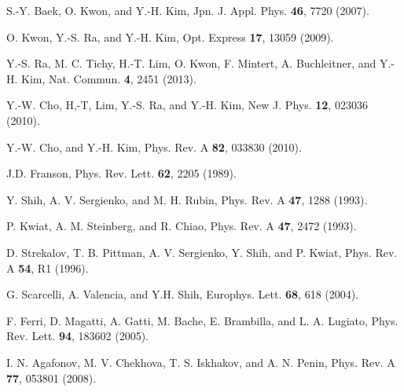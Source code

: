 \documentclass[aps,prl,reprint,showpacs,superscriptaddress]{revtex4-1}
\begin{document}
\begin{thebibliography}{99}
S.-Y. Baek, O. Kwon, and Y.-H. Kim, Jpn. J. Appl. Phys.  \textbf{46}, 7720 (2007).

O. Kwon, Y.-S. Ra, and Y.-H. Kim, Opt. Express \textbf{17}, 13059 (2009).

Y.-S. Ra, M. C. Tichy, H.-T. Lim, O. Kwon, F. Mintert, A. Buchleitner, and Y.-H. Kim, Nat. Commun. \textbf{4}, 2451 (2013).

Y.-W. Cho, H,-T, Lim, Y.-S. Ra, and Y.-H. Kim, New J. Phys. \textbf{12}, 023036 (2010).
    
Y.-W. Cho, and Y.-H. Kim, Phys. Rev. A \textbf{82}, 033830 (2010).



J.D. Franson, Phys. Rev. Lett. \textbf{62}, 2205 (1989).


Y. Shih, A. V. Sergienko, and M. H. Rubin, Phys. Rev. A \textbf{47}, 1288 (1993).

P. Kwiat, A. M. Steinberg, and R. Chiao, Phys. Rev. A \textbf{47}, 2472 (1993).

D. Strekalov, T. B. Pittman, A. V. Sergienko, Y. Shih, and P. Kwiat, Phys. Rev. A \textbf{54}, R1 (1996).



G. Scarcelli, A. Valencia{,} and Y.H. Shih, Europhys. Lett. \textbf{68}, 618 (2004).

F. Ferri, D. Magatti, A. Gatti, M. Bache, E. Brambilla, and L. A. Lugiato, Phys. Rev. Lett. \textbf{94}, 183602 (2005).

I. N. Agafonov, M. V. Chekhova, T. S. Iskhakov, and A. N. Penin, Phys. Rev. A \textbf{77}, 053801 (2008).


\end{thebibliography}
\end{document}
